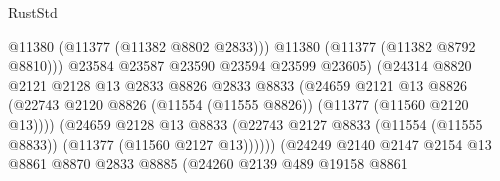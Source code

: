 \begin{lexlean}{RustStd}
\begin{coremodule}
                                              @11380
                                              (@11377 (@11382 @8802 @2833)))
                                            @11380
                                            (@11377 (@11382 @8792 @8810)))
                                          @23584
                                          @23587
                                          @23590
                                          @23594
                                          @23599
                                          @23605)
                                        (@24314
                                          @8820
                                          @2121
                                          @2128
                                          @13
                                          @2833
                                          @8826
                                          @2833
                                          @8833
                                          (@24659
                                            @2121
                                            @13
                                            @8826
                                            (@22743
                                              @2120
                                              @8826
                                              (@11554 (@11555 @8826))
                                              (@11377 (@11560 @2120 @13))))
                                          (@24659
                                            @2128
                                            @13
                                            @8833
                                            (@22743
                                              @2127
                                              @8833
                                              (@11554 (@11555 @8833))
                                              (@11377 (@11560 @2127 @13))))))
                                      (@24249
                                        @2140
                                        @2147
                                        @2154
                                        @13
                                        @8861
                                        @8870
                                        @2833
                                        @8885
                                        (@24260
                                          @2139
                                          @489
                                          @19158
                                          @8861

\end{coremodule}
\end{lexlean}
